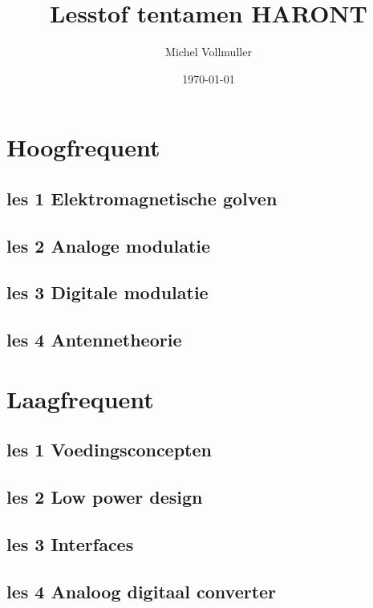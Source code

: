 \documentclass{article}
\begin{document}
\title{Lesstof tentamen HARONT}
\author{Michel Vollmuller}
\date{\today}

\maketitle


\tableofcontents

\newpage

\section{Hoogfrequent}

    \subsection{les 1 Elektromagnetische golven}
    

    \newpage
    \subsection{les 2 Analoge modulatie}
    

    \newpage
    \subsection{les 3 Digitale modulatie}
    

    \subsection{les 4 Antennetheorie}
    

\newpage

\section{Laagfrequent}

    \subsection{les 1 Voedingsconcepten}
    

    \subsection{les 2 Low power design}
    

    \subsection{les 3 Interfaces}
    

    \subsection{les 4 Analoog digitaal converter}
    

\newpage

\end{document}
